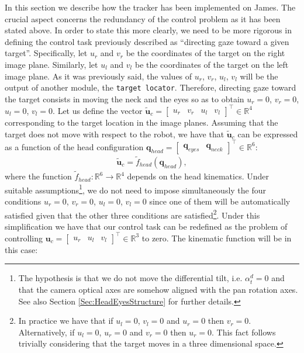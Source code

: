 In this section we describe how the tracker has been implemented on James. The crucial aspect concerns the redundancy of the control problem as it has been stated above. In order to state this more clearly, we need to be more rigorous in defining the control task previously described as ``directing gaze toward a given target''. Specifically, let $u_r$ and $v_r$ be the coordinates of the target on the right image plane. Similarly, let $u_l$ and $v_l$ be the coordinates of the target on the left image plane. As it was previously said, the values of $u_r$, $v_r$, $u_l$, $v_l$ will be the output of another module, the {\tt target locator}. Therefore, directing gaze toward the target consists in moving the neck and the eyes so as to obtain $u_r=0$, $v_r=0$, $u_l=0$, $v_l=0$. Let us define the vector $\tilde {\mathbf u}_c= \begin{bmatrix} u_r & v_r & u_l & v_l \end{bmatrix}^\top \in \mathbb R^4$ corresponding to the target location in the image planes. Assuming that the target does not move with respect to the robot, we have that $\tilde {\mathbf u}_c$ can be expressed as a function of the head configuration $\mathbf q_{head} = \begin{bmatrix} \mathbf q_{eyes} & \mathbf q_{neck} \end{bmatrix}^\top \in \mathbb R^6$:
\begin{eqnarray*}
\tilde {\mathbf u}_c = \tilde f_{head} (\mathbf q_{head}),
\end{eqnarray*}
where the function $\tilde f_{head} : \mathbb R^6 \longrightarrow \mathbb R^4$ depends on the head kinematics. Under suitable assumptions\footnote{The hypothesis is that we do not move the differential tilt, i.e. $\alpha_t^d = 0$ and that the camera optical axes are somehow aligned with the pan rotation axes. See also Section \ref{Sec:HeadEyesStructure} for further details.}, we do not need to impose simultaneously the four conditions $u_r=0$, $v_r=0$, $u_l=0$, $v_l=0$ since one of them will be automatically satisfied given that the other three conditions are satisfied\footnote{In practice we have that if $u_l=0$, $v_l=0$ and $u_r=0$ then $v_r=0$. Alternatively, if $u_l=0$, $u_r=0$ and $v_r=0$ then $u_r=0$. This fact follows trivially considering that the target moves in a three dimensional space.}. Under this simplification we have that our control task can be redefined as the problem of controlling ${\mathbf u}_c= \begin{bmatrix} u_r & u_l & v_l \end{bmatrix}^\top \in \mathbb R^3$ to zero. The kinematic function will be in this case:
